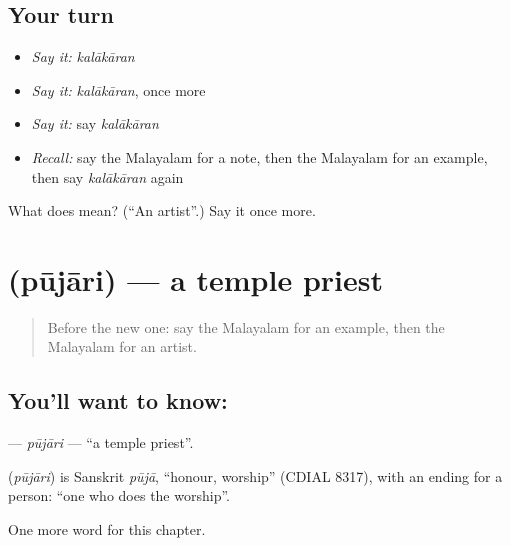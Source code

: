 \subsection*{Your turn}
\begin{itemize}
\raggedright
  \item \emph{Say it:} \emph{kalākāran}
  \item \emph{Say it:} \emph{kalākāran}, once more
  \item \emph{Say it:} say \emph{kalākāran}
  \item \emph{Recall:} say the Malayalam for a note, then the Malayalam for an example, then say \emph{kalākāran} again
\end{itemize}

\begin{tcolorbox}[breakable,colback=teal!4,colframe=teal!35!black,title={Before you move on}]
What does  mean? (\textquotedblleft{}An artist\textquotedblright{}.) Say it once more.
\end{tcolorbox}
\section[\texorpdfstring{\ml{പൂജാരി} (pūjāri)}{പൂജാരി (pūjāri)}]{ (pūjāri) — a temple priest}

\label{lesson:ML-C262-pujari}



\begin{quote}
Before the new one: say the Malayalam for an example, then the Malayalam for an artist.
\end{quote}

\subsection*{You'll want to know: }
\textbf{} — \emph{pūjāri} — \textquotedblleft{}a temple priest\textquotedblright{}.

\begin{cousinweb}
\textbf{} (\emph{pūjāri}) is Sanskrit \emph{pūjā}, \textquotedblleft{}honour, worship\textquotedblright{} (CDIAL 8317), with an ending for a person: \textquotedblleft{}one who does the worship\textquotedblright{}.
\end{cousinweb}

\begin{grammarlens}[title={What you've built}]
One more word for this chapter.
\end{grammarlens}

